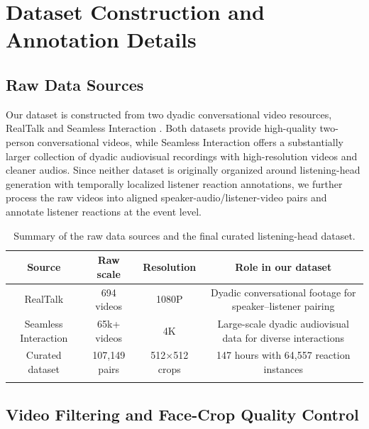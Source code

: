 \section{Dataset Construction and Annotation Details}  \label{app:data_curation}

\subsection{Raw Data Sources}  \label{app:raw_sources}

Our dataset is constructed from two dyadic conversational video resources, RealTalk \cite{geng2023affective} and Seamless Interaction \cite{agrawal2025seamless}. Both datasets provide high-quality two-person conversational videos, while Seamless Interaction offers a substantially larger collection of dyadic audiovisual recordings with high-resolution videos and cleaner audios. Since neither dataset is originally organized around listening-head generation with temporally localized listener reaction annotations, we further process the raw videos into aligned speaker-audio/listener-video pairs and annotate listener reactions at the event level.

\begin{table}[!htbp]
    \centering
    \fontsize{8.5pt}{7pt}\selectfont
    \setcellgapes{1.5pt}
    \makegapedcells
    \setlength{\tabcolsep}{3pt} 
    \caption{Summary of the raw data sources and the final curated listening-head dataset.}
    \label{tab:app_source_summary}
    \begin{tabular}{cccc}
        \Xhline{1.2pt}
        Source & Raw scale & Resolution & Role in our dataset \\
        \hline
        RealTalk & 694 videos & 1080P & Dyadic conversational footage for speaker--listener pairing \\
        Seamless Interaction & 65k+ videos & 4K & Large-scale dyadic audiovisual data for diverse interactions \\
        \hline
        Curated dataset & 107,149 pairs & 512$\times$512 crops & 147 hours with 64,557 reaction instances \\
        \Xhline{1.2pt}
    \end{tabular}
\end{table}






\subsection{Video Filtering and Face-Crop Quality Control}  \label{app:video_filtering}

